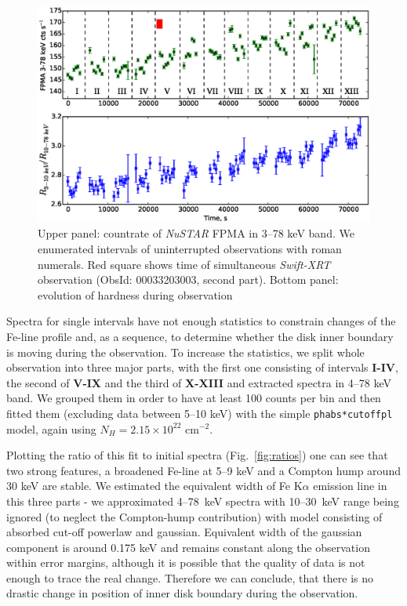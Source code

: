 \documentclass[a4paper,fleqn,usenatbib]{mnras}
\def\swiftx{{\em Swift-XRT\,}}
\def\nustar{{\em NuSTAR\,}}
\begin{document}
\begin{figure}
\centerline{\includegraphics[scale=0.7]{nuAlc_color_v04.eps}}
\caption{Upper panel: countrate of \nustar\,FPMA in 3--78 keV band. We enumerated intervals of uninterrupted observations with roman numerals. Red square shows time of simultaneous \swiftx observation (ObsId: 00033203003, second part). Bottom panel: evolution of hardness during observation} 
\label{fig:nust_lc}
\end{figure} 

Spectra for single intervals have not enough statistics to constrain changes of the Fe-line profile and, as a sequence, to determine whether the disk inner boundary  is moving during the observation. 
To increase the statistics, we split whole observation into three major parts, with the first one consisting of intervals {\bf I-IV}, the second of {\bf V-IX} and the third of {\bf X-XIII} and extracted spectra in 4--78 keV band. 
We grouped them in order to have at least 100 counts per bin and then fitted them (excluding data between 5--10 keV) with the simple \texttt{phabs*cutoffpl} model, again using $N_{H} = 2.15\times10^{22}$ cm$^{-2}$.  

Plotting the ratio of this fit to initial spectra (Fig.~\ref{fig:ratios}) one can see that two strong features, a broadened Fe-line at 5--9 keV and a Compton hump around 30 keV are stable. 
We estimated the equivalent width of  Fe K$\alpha$ emission line in this three parts - we approximated 4--78~keV spectra with 10--30~keV range being ignored (to neglect the Compton-hump contribution) with model consisting of absorbed cut-off powerlaw and gaussian. 
Equivalent width of the gaussian component is around 0.175 keV and remains constant along the observation within error margins, although it is possible that the quality of data is not enough to trace the real change.
Therefore we can conclude, that there is no drastic change in position of inner disk boundary during the observation. 
\end{document}

